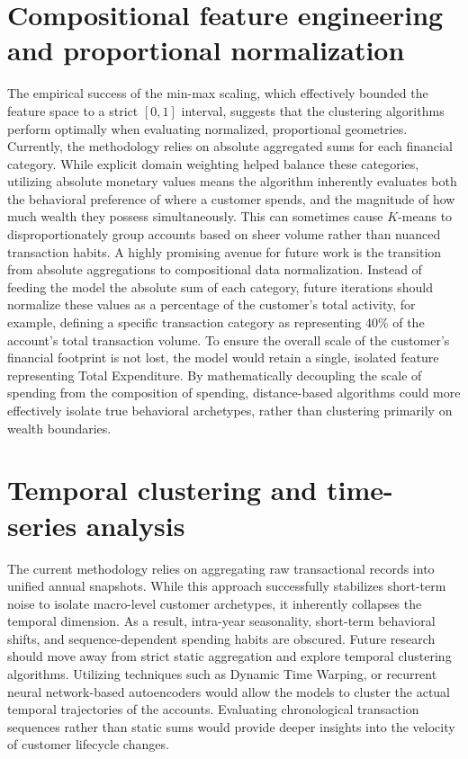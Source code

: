 \section{Compositional feature engineering and proportional normalization}
The empirical success of the min-max scaling, which effectively bounded the feature space to a strict $[0, 1]$ interval, suggests that the clustering algorithms perform optimally when evaluating normalized, proportional geometries.
Currently, the methodology relies on absolute aggregated sums for each financial category.
While explicit domain weighting helped balance these categories, utilizing absolute monetary values means the algorithm inherently evaluates both the behavioral preference of where a customer spends, and the magnitude of how much wealth they possess simultaneously.
This can sometimes cause $K$-means to disproportionately group accounts based on sheer volume rather than nuanced transaction habits.
A highly promising avenue for future work is the transition from absolute aggregations to compositional data normalization.
Instead of feeding the model the absolute sum of each category, future iterations should normalize these values as a percentage of the customer's total activity, for example, defining a specific transaction category as representing 40\% of the account's total transaction volume.
To ensure the overall scale of the customer's financial footprint is not lost, the model would retain a single, isolated feature representing Total Expenditure.
By mathematically decoupling the scale of spending from the composition of spending, distance-based algorithms could more effectively isolate true behavioral archetypes, rather than clustering primarily on wealth boundaries.

\section{Temporal clustering and time-series analysis}
The current methodology relies on aggregating raw transactional records into unified annual snapshots.
While this approach successfully stabilizes short-term noise to isolate macro-level customer archetypes, it inherently collapses the temporal dimension.
As a result, intra-year seasonality, short-term behavioral shifts, and sequence-dependent spending habits are obscured.
Future research should move away from strict static aggregation and explore temporal clustering algorithms.
Utilizing techniques such as Dynamic Time Warping, or recurrent neural network-based autoencoders would allow the models to cluster the actual temporal trajectories of the accounts.
Evaluating chronological transaction sequences rather than static sums would provide deeper insights into the velocity of customer lifecycle changes.

